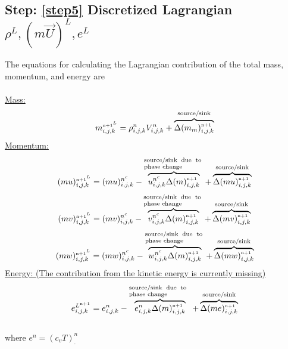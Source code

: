\documentclass[fleqn]{article}
\begin{document}
{\subsection{Step: \ref{step5}  \textsf{ Discretized Lagrangian $\rho^{L}, (m\vec{U})^{L}, e^{L}$}}

The equations for calculating the Lagrangian contribution of the total mass,
momentum, and energy are\\
\\
%
%
\underline{\textsf{Mass:}}\\
\begin{equation}
    \massnnLIJK = \rhonIJK \VnIJK + 
\overbrace{  \Delta{(m_{m})}^{\nadv}_{i,j,k}  }^{\text{source/sink}}  
\end{equation}
%
%
%
\underline{\textsf{Momentum:}}\\

\begin{equation}
    (mu)^{\nadv^{L}}_{i,j,k} = (mu)^{n^{c}}_{i,j,k} 
    -   \overbrace{ \uncIJK \Delta{ (m) }^{\nadv}_{i,j,k}}^{ \text{\pboxsmall{source/sink due to phase change}}} 
    +   \overbrace{   \Delta{ (mu) }^{\nadv}_{i,j,k}    }^{  \text{source/sink}  }
\end{equation}
%
%
\begin{equation}
    (mv)^{\nadv^{L}}_{i,j,k} = (mv)^{n^{c}}_{i,j,k} 
    -   \overbrace{ \vncIJK \Delta{ (m) }^{\nadv}_{i,j,k}}^{ \text{\pboxsmall{source/sink due to phase change}}} 
    +   \overbrace{   \Delta{ (mv) }^{\nadv}_{i,j,k}    }^{  \text{source/sink}  }
\end{equation}
%
%
\begin{equation}
    (mw)^{\nadv^{L}}_{i,j,k} = (mw)^{n^{c}}_{i,j,k} 
    -   \overbrace{ \wncIJK \Delta{ (m) }^{\nadv}_{i,j,k}}^{ \text{\pboxsmall{source/sink due to phase change}}} 
    +   \overbrace{   \Delta{ (mw) }^{\nadv}_{i,j,k}    }^{  \text{source/sink}  }
\end{equation}   
%
%
\underline{\textsf{Energy: (The contribution from the kinetic energy is currently missing)}}\\
%
\begin{equation}
     e^{L^{\nadv}}_{i,j,k}= e^n_{i,j,k}  - \overbrace{  e^n_{i,j,k} \Delta{(m)}^{\nadv}_{i,j,k}}^{\text{\pboxsmall{source/sink due to phase change} }  } +
    \overbrace{  \Delta{ (m e)^{\nadv}_{i,j,k}  }  }^{  \text{source/sink}  }
\end{equation}
\\
%
where $e^n= (c_{v}T)^n_.$\\
%
%
%
%
}
\end{document}

